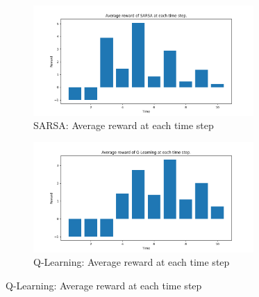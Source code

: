 \documentclass{class}
\begin{document}
\begin{figure}[H]
    \centering
    \begin{subfigure}[t]{0.47\linewidth}
        \centering
        \includegraphics[height=4.2cm]{../plots/r_over_time/sarsa_r_over_time.png}
        \caption{SARSA: Average reward at each time step}
        \label{fig:sarsa_r_over_time}
    \end{subfigure}
    \hspace{0.03\linewidth}
    \begin{subfigure}[t]{0.47\linewidth}
        \centering
        \includegraphics[height=4.2cm]{../plots/r_over_time/q_learning_r_over_time.png}
        \caption{Q-Learning: Average reward at each time step}
        \label{fig:qlearning_r_over_time}
    \end{subfigure}

    \vspace{0.5cm} %


\end{figure}
\end{document}
